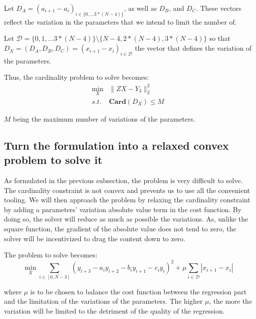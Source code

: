 \documentclass[11pt]{article}
\begin{document}
        Let $D_A = (a_{i+1} - a_i)_{i \in \{0,\ldots 3*(N-4)\}}$, as well as $D_B$, and $D_C$. These vectors reflect the variation in the parameters that we intend to limit the number of.

        Let $\mathcal{D} = \{0,1,\ldots 3*(N-4)\}\setminus\{N-4, 2*(N-4), 3*(N-4)\} $
        so that $ D_X = (D_A, D_B, D_C) = (x_{i+1} - x_i)_{i \in \mathcal{D}} $ the vector that defines the variation of the parameters. 
        
        Thus, the cardinality problem to solve becomes:
        \begin{equation*}
            \begin{aligned}
                \min_{X}&{\lVert ZX - Y_3 \rVert^2_2} \\
                    s.t.    & \bm{Card}(D_X) \le M
            \end{aligned}
        \end{equation*}

        $M$ being the maximum number of variations of the parameters.
    
    \subsection{Turn the formulation into a relaxed convex problem to solve it}
        As formulated in the previous subsection, the problem is very difficult to solve. The cardinality constraint is not convex and prevents us to use all the convenient tooling. We will then approach the problem by relaxing the cardinality constraint by adding a parameters' variation absolute value term in the cost function. By doing so, the solver will reduce as much as possible the variations. As, unlike the square function, the  gradient of the absolute value does not tend to zero, the solver will be incentivized to drag the content down to zero.

        The problem to solve becomes:
        \begin{equation}
            \label{eq:equation abs}
                \min_{X}{\sum_{i\in[0, N-3]}{(y_{i+3}  - a_i y_{i+2} - b_i y_{i+1} - c_i y_i)^2} + \mu\sum_{i \in \mathcal{D}}{|x_{i+1} - x_i|}}
        \end{equation}
        
        where $\mu$ is to be chosen to balance the cost function between the regression part and the limitation of the variations of the parameters. The higher $\mu$, the more the variation will be limited to the detriment of the quality of the regression.
\end{document}
